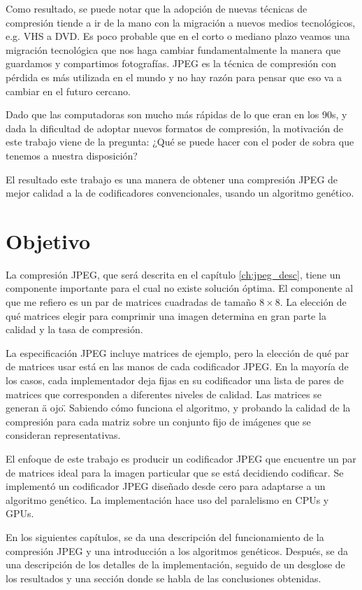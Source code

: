 Como resultado, se puede notar que la adopción de nuevas técnicas de compresión
tiende a ir de la mano con la migración a nuevos medios tecnológicos, e.g. VHS
a DVD. Es poco probable que en el corto o mediano plazo veamos una migración
tecnológica que nos haga cambiar fundamentalmente la manera que guardamos y
compartimos fotografías. JPEG es la técnica de compresión con pérdida es más
utilizada en el mundo y no hay razón para pensar que eso va a cambiar en el
futuro cercano.

Dado que las computadoras son mucho más rápidas de lo que eran en los 90s, y
dada la dificultad de adoptar nuevos formatos de compresión, la motivación de
este trabajo viene de la pregunta:  ¿Qué se puede hacer con el poder de sobra
que tenemos a nuestra disposición?

El resultado este trabajo es una manera de obtener una compresión JPEG de mejor
calidad a la de codificadores convencionales, usando un algoritmo genético.

\section{Objetivo}

La compresión JPEG, que será descrita en el capítulo \ref{ch:jpeg_desc}, tiene
un componente importante para el cual no existe solución óptima. El componente
al que me refiero es un par de matrices cuadradas de tamaño $8\times8$. La
elección de qué matrices elegir para comprimir una imagen determina en gran
parte la calidad y la tasa de compresión.

La especificación JPEG \cite{jpeg-spec} incluye matrices de ejemplo, pero la
elección de qué par de matrices usar está en las manos de cada codificador
JPEG. En la mayoría de los casos, cada implementador deja fijas en su
codificador una lista de pares de matrices que corresponden a diferentes
niveles de calidad. Las matrices se generan \"a ojo\". Sabiendo cómo funciona
el algoritmo, y probando la calidad de la compresión para cada matriz sobre un
conjunto fijo de imágenes que se consideran representativas.

El enfoque de este trabajo es producir un codificador JPEG que encuentre un par
de matrices ideal para la imagen particular que se está decidiendo codificar.
Se implementó un codificador JPEG diseñado desde cero para adaptarse a un
algoritmo genético. La implementación hace uso del paralelismo en CPUs y GPUs.

En los siguientes capítulos, se da una descripción del funcionamiento de la
compresión JPEG y una introducción a los algoritmos genéticos. Después, se da
una descripción de los detalles de la implementación, seguido de un desglose de
los resultados y una sección donde se habla de las conclusiones obtenidas.


